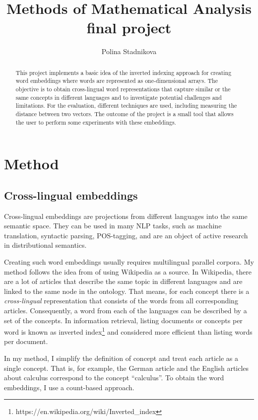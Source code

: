 \documentclass[a4paper]{article}
\title{Methods of Mathematical Analysis final project}
\author{Polina Stadnikova}
\begin{document}
\maketitle
\begin{abstract}
This project implements a basic idea of the inverted indexing approach for creating word embeddings where words are represented as one-dimensional arrays. The objective is to obtain cross-lingual word representations that capture similar or the same concepts in different languages and to investigate potential challenges and limitations. For the evaluation, different techniques are used, including measuring the distance between two vectors. The outcome of the project is a small tool that allows the user to perform some experiments with these embeddings. 
\end{abstract}

\section{Method}
\subsection{Cross-lingual embeddings}
Cross-lingual embeddings are projections from different languages into the same semantic space. They can be used in many NLP tasks, such as machine translation, syntactic parsing, POS-tagging, and are an object of active research in distributional semantics.\par
Creating such word embeddings usually requires multilingual parallel corpora. My method follows the idea from \cite{b} of using Wikipedia as a source. In Wikipedia, there are a lot of articles that describe the same topic in different languages and are linked to the same node in the ontology. That means, for each concept there is a \textit{cross-lingual} representation that consists of the words from all corresponding articles. Consequently, a word from each of the languages can be described by a set of the concepts\cite{b}. In information retrieval, listing documents or concepts per word is known as inverted index\footnote{https://en.wikipedia.org/wiki/Inverted\_index} and considered more efficient than listing words per document. \par
In my method, I simplify the definition of concept and treat each article as a single concept. That is, for example, the German article and the English articles about calculus correspond to the concept ``calculus''. To obtain the word embeddings, I use a count-based approach.
\end{document}
